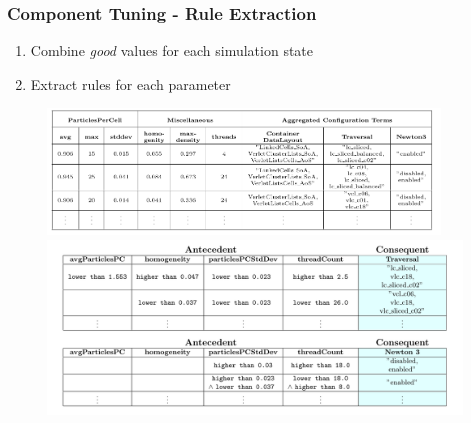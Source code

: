 \documentclass[
	10pt,
	t		%
]{beamer}
\begin{document}
\begin{frame}
	\frametitle{Component Tuning - Rule Extraction}
	
	\begin{enumerate}
		\item Combine \textit{good} values for each simulation state
		\item Extract rules for each parameter
	\end{enumerate}
	
	\begin{figure}
		\centering
		\includegraphics[width=0.93\textwidth, trim={0 3.8cm 0 0},clip]{figures/aggregated-data-component.png}
		\vspace{1.5cm}
		\includegraphics[width=0.98\textwidth, trim={0 8cm 0 0},clip]{figures/final-rules-component.png}
	\end{figure}
\end{frame}
\end{document}
